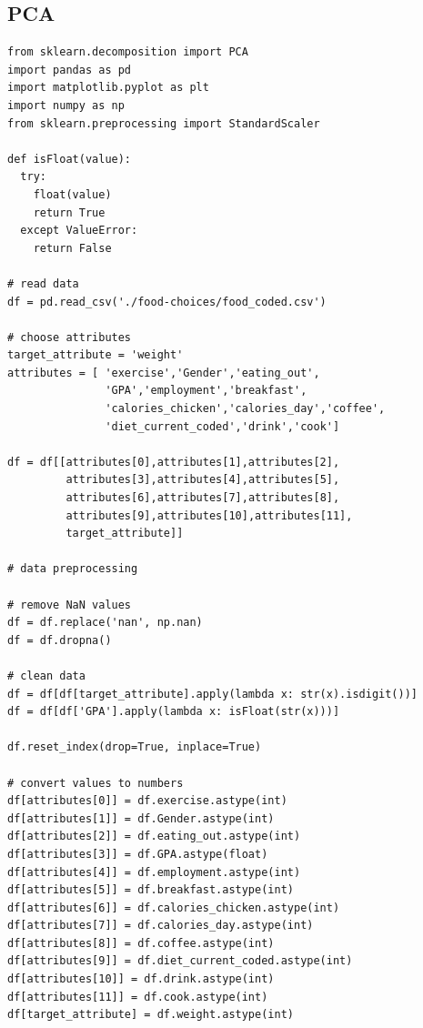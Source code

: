 \documentclass[12pt,a4paper]{article}
\begin{document}
\subsection{PCA}

\begin{lstlisting}
from sklearn.decomposition import PCA
import pandas as pd
import matplotlib.pyplot as plt
import numpy as np
from sklearn.preprocessing import StandardScaler

def isFloat(value):
  try:
    float(value)
    return True
  except ValueError:
    return False

# read data
df = pd.read_csv('./food-choices/food_coded.csv')

# choose attributes
target_attribute = 'weight'
attributes = [ 'exercise','Gender','eating_out',
               'GPA','employment','breakfast', 
               'calories_chicken','calories_day','coffee',
               'diet_current_coded','drink','cook']

df = df[[attributes[0],attributes[1],attributes[2],
         attributes[3],attributes[4],attributes[5],
         attributes[6],attributes[7],attributes[8],
         attributes[9],attributes[10],attributes[11],
         target_attribute]]

# data preprocessing

# remove NaN values
df = df.replace('nan', np.nan)
df = df.dropna()

# clean data
df = df[df[target_attribute].apply(lambda x: str(x).isdigit())]
df = df[df['GPA'].apply(lambda x: isFloat(str(x)))]

df.reset_index(drop=True, inplace=True)

# convert values to numbers
df[attributes[0]] = df.exercise.astype(int)
df[attributes[1]] = df.Gender.astype(int)
df[attributes[2]] = df.eating_out.astype(int)
df[attributes[3]] = df.GPA.astype(float)
df[attributes[4]] = df.employment.astype(int)
df[attributes[5]] = df.breakfast.astype(int)
df[attributes[6]] = df.calories_chicken.astype(int)
df[attributes[7]] = df.calories_day.astype(int)
df[attributes[8]] = df.coffee.astype(int)
df[attributes[9]] = df.diet_current_coded.astype(int)
df[attributes[10]] = df.drink.astype(int)
df[attributes[11]] = df.cook.astype(int)
df[target_attribute] = df.weight.astype(int)


\end{lstlisting}
\end{document}
